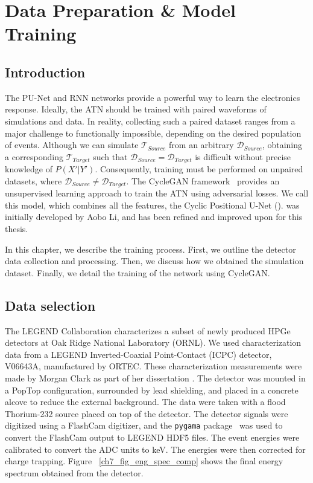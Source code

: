 \chapter{Data Preparation \& Model Training} \label{chap:training}

\section{Introduction}
The PU-Net and RNN networks provide a powerful way to learn the electronics response. Ideally, the ATN should be trained with paired waveforms of simulations and data. In reality, collecting such a paired dataset ranges from a major challenge to functionally impossible, depending on the desired population of events. Although we can simulate $\mathcal{T}_{Source}$ from an arbitrary $\mathcal{D}_{Source}$, obtaining a corresponding $\mathcal{T}_{Target}$ such that $\mathcal{D}_{Source} = \mathcal{D}_{Target}$ is difficult without precise knowledge of $P(X'|Y')$. Consequently, training must be performed on unpaired datasets, where $\mathcal{D}_{Source} \neq \mathcal{D}_{Target}$. The CycleGAN framework~\cite{CycleGAN} provides an unsupervised learning approach to train the ATN using adversarial losses. We call this model, which combines all the features, the Cyclic Positional U-Net ({\cpunet}). {\cpunet} was initially developed by Aobo Li, and has been refined and improved upon for this thesis. 

In this chapter, we describe the {\cpunet} training process. First, we outline the detector data collection and processing. Then, we discuss how we obtained the simulation dataset. Finally, we detail the training of the network using CycleGAN.

\section{Data selection}
The LEGEND Collaboration characterizes a subset of newly produced HPGe detectors at Oak Ridge National Laboratory (ORNL). We used characterization data from a LEGEND Inverted-Coaxial Point-Contact (ICPC) detector, V06643A, manufactured by ORTEC. These characterization measurements were made by Morgan Clark as part of her dissertation \cite{clark2023phdthesis}. The detector was mounted in a PopTop configuration, surrounded by lead shielding, and placed in a concrete alcove to reduce the external background. The data were taken with a flood Thorium-232 source placed on top of the detector. The detector signals were digitized using a FlashCam digitizer, and the \texttt{pygama} package~\cite{pygama} was used to convert the FlashCam output to LEGEND HDF5 files.  The event energies were calibrated to convert the ADC units to keV. The energies were then corrected for charge trapping. Figure ~\ref{ch7_fig_eng_spec_comp} shows the final energy spectrum obtained from the detector.

